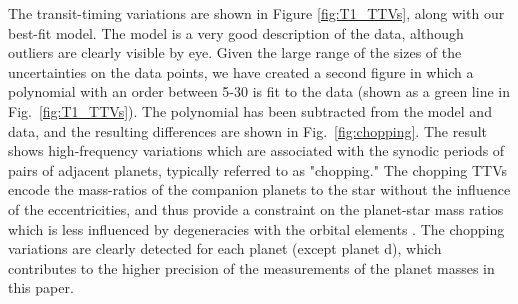 \documentclass[fleqn,usenatbib]{mnras} %
\begin{document}
The transit-timing variations are shown in Figure \ref{fig:T1_TTVs}, along
with our best-fit model.  The model is a very good description of the data,
although outliers are clearly visible by eye.  Given the large range of
the sizes of the uncertainties on the data points, we have created a
second figure in which a polynomial with an order between 5-30 is fit to
the data (shown as a green line in Fig.\ \ref{fig:T1_TTVs}).  The polynomial
has been subtracted from the model and data, and the resulting differences 
are shown in Fig.\ \ref{fig:chopping}.  The result shows high-frequency variations which are
associated with the synodic periods of pairs of adjacent planets, typically
referred to as "chopping."  The chopping TTVs encode the mass-ratios of
the companion planets to the star without the influence of the eccentricities,
and thus provide a constraint on the planet-star mass ratios which is less
influenced by degeneracies with the orbital elements \citep{Deck2015}.  The 
chopping variations are clearly detected for each planet
(except planet d), which contributes to the higher
precision of the measurements of the planet
masses in this paper.
\end{document}
